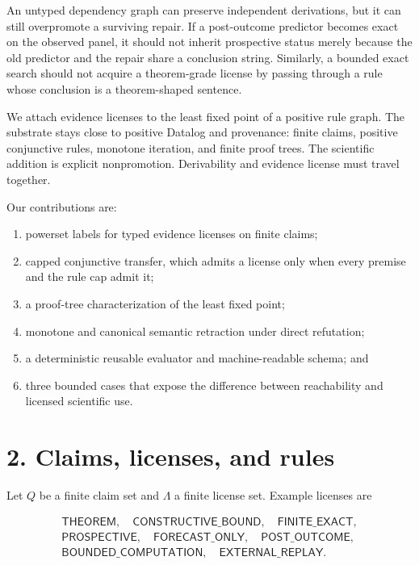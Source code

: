 \documentclass[
  11pt,
]{article}
\providecommand{\tightlist}{%
  \setlength{\itemsep}{0pt}\setlength{\parskip}{0pt}}
\begin{document}
An untyped dependency graph can preserve independent derivations, but it
can still overpromote a surviving repair. If a post-outcome predictor
becomes exact on the observed panel, it should not inherit prospective
status merely because the old predictor and the repair share a
conclusion string. Similarly, a bounded exact search should not acquire
a theorem-grade license by passing through a rule whose conclusion is a
theorem-shaped sentence.

We attach evidence licenses to the least fixed point of a positive rule
graph. The substrate stays close to positive Datalog and provenance:
finite claims, positive conjunctive rules, monotone iteration, and
finite proof trees. The scientific addition is explicit nonpromotion.
Derivability and evidence license must travel together.

Our contributions are:

\begin{enumerate}
\def\labelenumi{\arabic{enumi}.}
\tightlist
\item
  powerset labels for typed evidence licenses on finite claims;
\item
  capped conjunctive transfer, which admits a license only when every
  premise and the rule cap admit it;
\item
  a proof-tree characterization of the least fixed point;
\item
  monotone and canonical semantic retraction under direct refutation;
\item
  a deterministic reusable evaluator and machine-readable schema; and
\item
  three bounded cases that expose the difference between reachability
  and licensed scientific use.
\end{enumerate}

\hypertarget{claims-licenses-and-rules}{%
\section{2. Claims, licenses, and
rules}\label{claims-licenses-and-rules}}

Let \(Q\) be a finite claim set and \(\Lambda\) a finite license set.
Example licenses are

\[
\begin{gathered}
\textsf{THEOREM}, \quad \textsf{CONSTRUCTIVE\_BOUND}, \quad
\textsf{FINITE\_EXACT}, \\
\textsf{PROSPECTIVE}, \quad \textsf{FORECAST\_ONLY}, \quad
\textsf{POST\_OUTCOME}, \\
\textsf{BOUNDED\_COMPUTATION}, \quad \textsf{EXTERNAL\_REPLAY}.
\end{gathered}
\]
\end{document}
